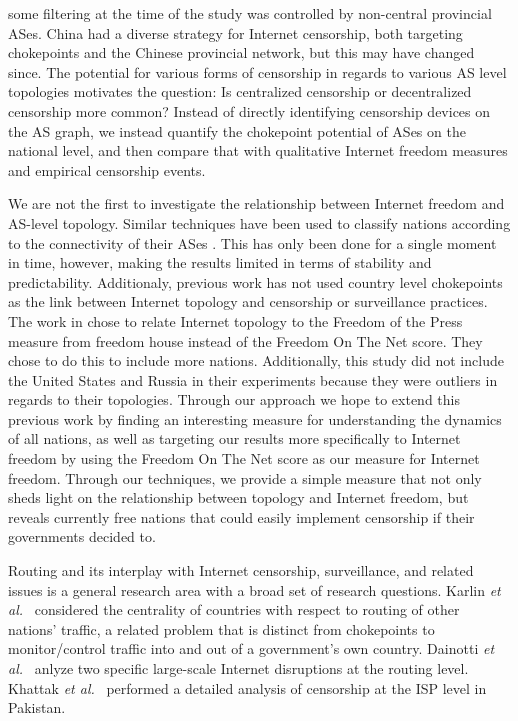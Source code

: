 some filtering at the time of the study was controlled by non-central provincial
ASes. China had a
diverse strategy for Internet censorship, both targeting chokepoints and the
Chinese provincial network, but this may have changed since. The potential for various forms of censorship in
regards to various AS level topologies motivates the question: Is centralized
censorship or decentralized censorship more common? Instead of directly
identifying censorship devices on the AS graph, we instead quantify the
chokepoint potential of ASes on the national level, and then compare that with
qualitative Internet freedom measures and empirical censorship events.
\par
We are not the first to investigate the relationship between Internet freedom and
AS-level topology. Similar techniques have been used to classify nations according
to the connectivity of their ASes \cite{politicsrouting}. This has only been done for a
single moment in time, however, making the results limited in terms of stability and predictability.
Additionaly, previous work has not used country level chokepoints as the link between Internet topology
and censorship or surveillance practices. The work in \cite{politicsrouting} chose to relate Internet topology
to the Freedom of the Press measure from freedom house instead of the Freedom On The Net score. They chose to do this
to include more nations. Additionally, this study did not include the United States and Russia in their experiments because they were
outliers in regards to their topologies. Through our approach we hope to extend this previous work by finding an interesting measure for
understanding the dynamics of all nations, as well as targeting our results more specifically to Internet freedom by using the Freedom On
The Net score as our measure for Internet freedom. Through our techniques, we provide a simple measure that not only 
sheds light on the relationship between topology and Internet freedom, but reveals currently free
nations that could easily implement censorship if their governments decided to.

Routing and its interplay with Internet censorship, surveillance, and related
issues is a general research area with a broad set of research questions.
Karlin \emph{et al.}~\cite{DBLP:journals/corr/abs-0903-3218} considered the
centrality of countries with respect to routing of other nations' traffic, a
related problem that is distinct from chokepoints to monitor/control traffic
into and out of a government's own country.  Dainotti \emph{et
al.}~\cite{Dainotti:2011:ACI:2068816.2068818} anlyze two specific large-scale
Internet disruptions at the routing level.  Khattak \emph{et
al.}~\cite{Khattak:2014:LCI:2663716.2663750} performed a detailed analysis of
censorship at the ISP level in Pakistan.

